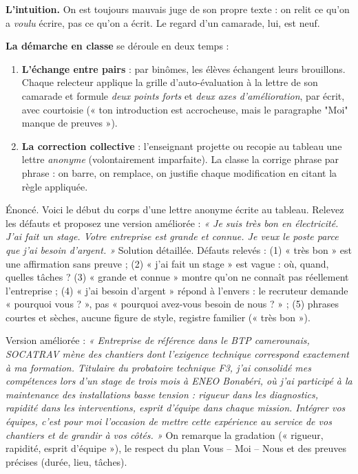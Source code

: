 \documentclass[11pt]{article}
\begin{document}
\textbf{L'intuition.} On est toujours mauvais juge de son propre texte : on relit ce qu'on a \emph{voulu} écrire, pas ce qu'on a écrit. Le regard d'un camarade, lui, est neuf.

\textbf{La démarche en classe} se déroule en deux temps :

\begin{enumerate}
\item \textbf{L'échange entre pairs} : par binômes, les élèves échangent leurs brouillons. Chaque relecteur applique la grille d'auto-évaluation à la lettre de son camarade et formule \emph{deux points forts} et \emph{deux axes d'amélioration}, par écrit, avec courtoisie (« ton introduction est accrocheuse, mais le paragraphe "Moi" manque de preuves »).
\item \textbf{La correction collective} : l'enseignant projette ou recopie au tableau une lettre \emph{anonyme} (volontairement imparfaite). La classe la corrige phrase par phrase : on barre, on remplace, on justifie chaque modification en citant la règle appliquée.
\end{enumerate}

\begin{exoresolu}
Énoncé. Voici le début du corps d'une lettre anonyme écrite au tableau. Relevez les défauts et proposez une version améliorée : \emph{« Je suis très bon en électricité. J'ai fait un stage. Votre entreprise est grande et connue. Je veux le poste parce que j'ai besoin d'argent. »}
\tcblower
Solution détaillée. Défauts relevés : (1) « très bon » est une affirmation sans preuve ; (2) « j'ai fait un stage » est vague : où, quand, quelles tâches ? (3) « grande et connue » montre qu'on ne connaît pas réellement l'entreprise ; (4) « j'ai besoin d'argent » répond à l'envers : le recruteur demande « pourquoi vous ? », pas « pourquoi avez-vous besoin de nous ? » ; (5) phrases courtes et sèches, aucune figure de style, registre familier (« très bon »).

Version améliorée : \emph{« Entreprise de référence dans le BTP camerounais, SOCATRAV mène des chantiers dont l'exigence technique correspond exactement à ma formation. Titulaire du probatoire technique F3, j'ai consolidé mes compétences lors d'un stage de trois mois à ENEO Bonabéri, où j'ai participé à la maintenance des installations basse tension : rigueur dans les diagnostics, rapidité dans les interventions, esprit d'équipe dans chaque mission. Intégrer vos équipes, c'est pour moi l'occasion de mettre cette expérience au service de vos chantiers et de grandir à vos côtés. »} On remarque la gradation (« rigueur, rapidité, esprit d'équipe »), le respect du plan Vous -- Moi -- Nous et des preuves précises (durée, lieu, tâches).
\end{exoresolu}
\end{document}
